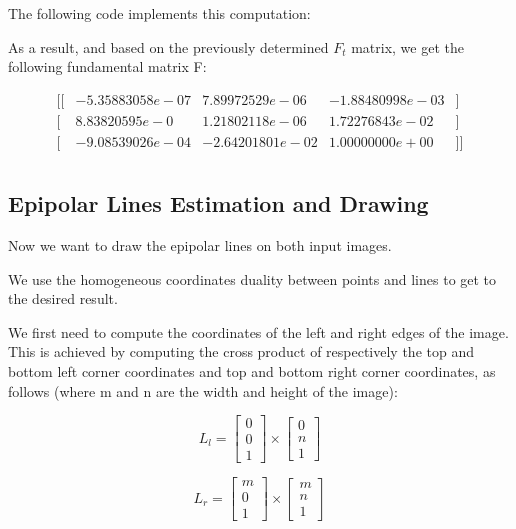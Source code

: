 \documentclass[a4paper,11pt]{article}
\begin{document}
The following code implements this computation:

\lstset{style=mystyle}


As a result, and based on the previously determined $F_{t}$ matrix, we get the following fundamental matrix F:

$$
\begin{matrix}
[ [ &-5.35883058e-07 & 7.89972529e-06  & -1.88480998e-03 & ]\\
 [ & 8.83820595e-0 & 1.21802118e-06 &  1.72276843e-02 &]\\
 [ &-9.08539026e-04 & -2.64201801e-02  & 1.00000000e+00 &]] \\
\end{matrix}
$$

\subsection{Epipolar Lines Estimation and Drawing}

Now we want to draw the epipolar lines on both input images.

We use the homogeneous coordinates duality between points and lines to get to the desired result.

We first need to compute the coordinates of the left and right edges of the image. This is achieved by computing the cross product of respectively the top and bottom left corner coordinates and top and bottom right corner coordinates, as follows (where m and n are the width and height of the image):

$$ L_{l} = 
\begin{bmatrix}
0 \\ 0 \\ 1
\end{bmatrix} 
\times
\begin{bmatrix}
 0 \\ n \\ 1
\end{bmatrix}
$$

$$ L_{r} = 
\begin{bmatrix}
 m \\ 0 \\ 1
\end{bmatrix} 
\times 
\begin{bmatrix}
 m \\ n \\ 1
\end{bmatrix}
$$
\end{document}

